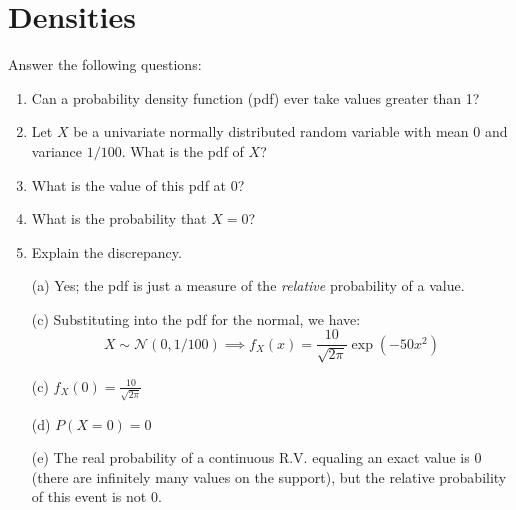 \documentclass[submit]{harvardml}
\begin{document}
\section*{Densities}
\begin{problem}
Answer the following questions:
\begin{enumerate}[label=(\alph*)]
  \item Can a probability density function (pdf) ever take values greater than 1?
  \item Let $X$ be a univariate normally distributed random variable with mean 0
        and variance $1/100$. What is the pdf of $X$?
  \item What is the value of this pdf at 0?
  \item What is the probability that $X = 0$?
  \item Explain the discrepancy.
\end{enumerate}
\end{problem}

\begin{enumerate}
	\item[(a)] Yes; the pdf is just a measure of the \textit{relative} probability of a value.
	
	\item[(c)] Substituting into the pdf for the normal, we have:
	\[
	X\sim \mathcal{N}(0, 1/100) 
	\implies f_X(x) 
	= \frac{10}{\sqrt{2\pi}}\exp\left(-50x^2\right)
	\]
	
	\item[(c)] $f_X(0) = \frac{10}{\sqrt{2\pi}}$
	
	\item[(d)] $P(X = 0) = 0$
	
	\item[(e)] The real probability of a continuous R.V. equaling an exact value is 0 (there are infinitely many values on the support), but the relative probability of this event is not 0.
\end{enumerate}



\newpage
\end{document}
